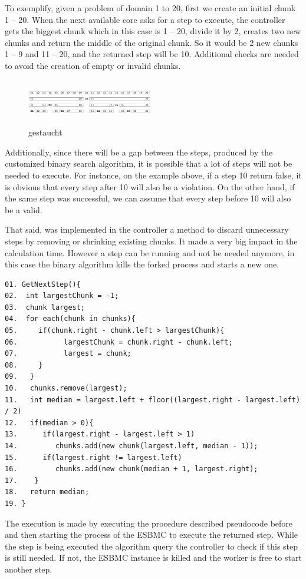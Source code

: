 To exemplify, given a problem of domain 1 to 20, first we create an initial chunk  1 – 20. When the next available core asks for a step to execute, the controller gets the biggest chunk which in this case is 1 – 20, divide it by 2, creates two new chunks and return the middle of the original chunk. So it would be 2 new chunks 1 – 9 and 11 – 20, and the returned step will be 10. Additional checks are needed to avoid the creation of empty or invalid chunks.
\begin{figure}[ht]
	\centering
  \includegraphics[width=0.49\textwidth, height=75px]{Image/Fig4.png}
	\caption{gestaucht}
	\label{fig2}
\end{figure}

Additionally, since there will be a gap between the steps, produced by the customized binary search algorithm, it is possible that a lot of steps will not be needed to execute. For instance, on the example above, if a step 10 return false, it is obvious that every step after 10 will also be a violation. On the other hand, if the same step was successful, we can assume that every step before 10 will also be a valid. 

That said, was implemented in the controller a method to discard unnecessary steps by removing or shrinking existing chunks. It made a very big impact in the calculation time. However a step can be running and not be needed anymore, in this case the binary algorithm kills the forked  process and starts a new one.
\begin{lstlisting}
01. GetNextStep(){
02.  int largestChunk = -1;
03.  chunk largest;
04.  for each(chunk in chunks){
05.     if(chunk.right - chunk.left > largestChunk){
06.           largestChunk = chunk.right - chunk.left;
07.           largest = chunk;
08.     }
09.   }	
10.   chunks.remove(largest);	
11.   int median = largest.left + floor((largest.right - largest.left) / 2)
12.   if(median > 0){
13.      if(largest.right - largest.left > 1)
14.         chunks.add(new chunk(largest.left, median - 1));	
15.      if(largest.right != largest.left)
16.         chunks.add(new chunk(median + 1, largest.right);
17.    }
18.   return median;
19. }
\end{lstlisting}
 The execution is made by executing the procedure described pseudocode before and then starting the process of the ESBMC to execute the returned step.
While the step is being executed the algorithm query the controller to check if this step is still needed. If not, the ESBMC instance is killed and the worker is free to start another step.

